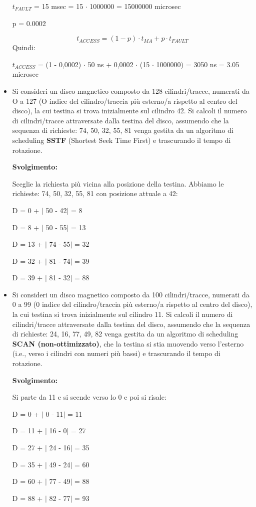\documentclass{article}
\begin{document}
\begin{itemize}
    $t_{FAULT}$ = 15 msec = 15 $\cdot$ 1000000 = 15000000 microsec\par
    p = 0.0002\par
    \begin{equation}
        t_{ACCESS} = (1 - p) \cdot t_{MA} + p \cdot t_{FAULT}
    \end{equation}
    Quindi:\par
    $t_{ACCESS}$ = (1 - 0,0002) $\cdot$ 50 ns + 0,0002 $\cdot$ (15 $\cdot$ 1000000) = 3050 ns = 3.05 microsec
    \item Si consideri un disco magnetico composto da 128 cilindri/tracce, numerati da O a 127 (O indice del cilindro/traccia più esterno/a rispetto al centro del disco), la cui testina si trova inizialmente sul cilindro 42. Si calcoli il numero di cilindri/tracce attraversate dalla testina del disco, assumendo che la sequenza di richieste: 74, 50, 32, 55, 81 venga gestita da un algoritmo di scheduling \textbf{SSTF} (Shortest Seek Time First) e trascurando il tempo di rotazione.\par
    \textbf{Svolgimento:}\par
    Sceglie la richiesta più vicina alla posizione della testina. Abbiamo le richieste: 74, 50, 32, 55, 81 con posizione attuale a 42: 
    \begin{center}
        D = 0 +  $|$ 50 - 42$|$  = 8\par
        D = 8 +  $|$ 50 - 55$|$  = 13\par
        D = 13 + $|$ 74 - 55$|$  = 32\par
        D = 32 + $|$ 81 - 74$|$  = 39\par
        D = 39 + $|$ 81 - 32$|$  = 88\par
    \end{center}
    \item Si consideri un disco magnetico composto da 100 cilindri/tracce, numerati da 0 a 99 (0 indice del cilindro/traccia più esterno/a rispetto al centro del disco), la cui testina si trova inizialmente sul cilindro 11. Si calcoli il numero di cilindri/tracce attraversate dalla testina del disco, assumendo che la sequenza di richieste: 24, 16, 77, 49, 82 venga gestita da un algoritmo di scheduling \textbf{SCAN (non-ottimizzato)}, che la testina si stia muovendo verso l'esterno (i.e., verso i cilindri con numeri più bassi) e trascurando il tempo di rotazione.\par
    \textbf{Svolgimento:}\par
    Si parte da 11 e si scende verso lo 0 e poi si risale:
    \begin{center}
        D = 0 +  $|$ 0 - 11$|$  = 11\par
        D = 11 + $|$ 16 - 0$|$  = 27\par
        D = 27 + $|$ 24 - 16$|$ = 35\par
        D = 35 + $|$ 49 - 24$|$ = 60\par
        D = 60 + $|$ 77 - 49$|$ = 88\par
        D = 88 + $|$ 82 - 77$|$ = 93\par
    \end{center}


\end{itemize}
\end{document}
